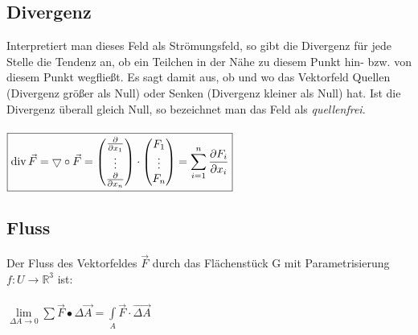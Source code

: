 \subsection{Divergenz}
  Interpretiert man dieses Feld als Strömungsfeld, so gibt die Divergenz für jede
  Stelle die Tendenz an, ob ein Teilchen in der Nähe zu diesem Punkt hin- bzw.
  von diesem Punkt wegfließt. Es sagt damit aus, ob und wo das Vektorfeld Quellen
  (Divergenz größer als Null) oder Senken (Divergenz kleiner als Null) hat. Ist
  die Divergenz überall gleich Null, so bezeichnet man das Feld als
  \textit{quellenfrei}.\\\\
  $\boxed{\operatorname{div} \vec{F}=\bigtriangledown\circ \vec{F}=
	\begin{pmatrix}
    	\frac{\partial}{\partial x_1 }\\
    	\vdots\\
    	\frac{\partial}{\partial x_n}
    \end{pmatrix}\cdot
	\begin{pmatrix}
    	F_1\\
    	\vdots\\
    	F_n
  \end{pmatrix}=
  \sum\limits_{i=1}^n \dfrac{\partial F_i}{\partial x_i}}$

\subsection{Fluss}
  Der Fluss des Vektorfeldes $\vec{F}$ durch das Flächenstück G mit
  Parametrisierung $f:U\rightarrow\mathbb{R}^3$ ist:\\\\
  $\boxed{\lim\limits_{\Delta A \to 0}\sum \vec F \bullet \Delta\vec A = \int\limits_A \vec F \cdot \vec{\Delta A}}$

